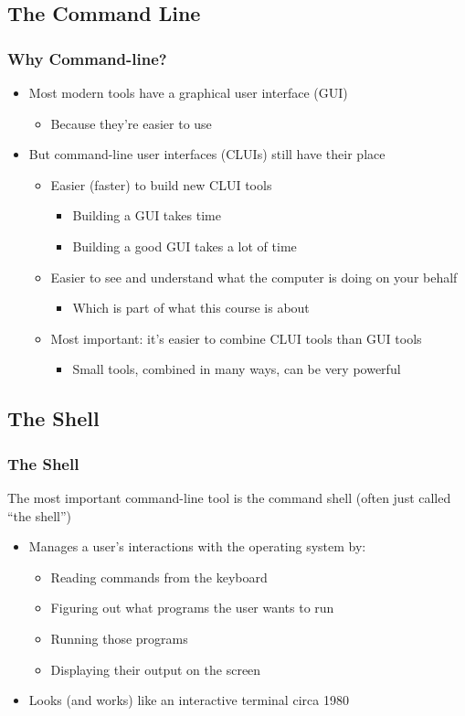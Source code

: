 \documentclass{beamer}
\begin{document}
\subsection{The Command Line}
\begin{frame}\frametitle{Why Command-line?}
\begin{itemize}
\item Most modern tools have a graphical user interface (GUI)
\begin{itemize}
    \item Because they're easier to use
\end{itemize}
\item But command-line user interfaces (CLUIs) still have their place
\begin{itemize}
    \item Easier (faster) to build new CLUI tools
\begin{itemize}
          \item Building a GUI takes time
          \item Building a good GUI takes a lot of time
\end{itemize}
    \item Easier to see and understand what the computer is doing on your behalf
\begin{itemize}
          \item Which is part of what this course is about
\end{itemize}
    \item Most important: it's easier to combine CLUI tools than GUI tools
\begin{itemize}
          \item Small tools, combined in many ways, can be very powerful
\end{itemize}
\end{itemize}
\end{itemize}
\end{frame}

\subsection{The Shell}
\begin{frame}\frametitle{The Shell}
The most important command-line tool is the command shell (often just called “the shell”)
\begin{itemize}
    \item Manages a user's interactions with the operating system by:
\begin{itemize}
          \item Reading commands from the keyboard
          \item Figuring out what programs the user wants to run
          \item Running those programs
          \item Displaying their output on the screen
\end{itemize}
    \item Looks (and works) like an interactive terminal circa 1980
\end{itemize}
\end{frame}
\end{document}

